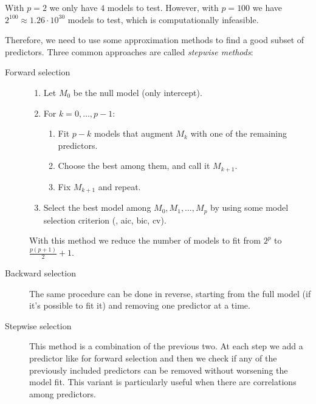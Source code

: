 \begin{example}
    With $p = 2$ we only have $4$ models to test. However, with $p = 100$ we have $2^{100} \approx 1.26 \cdot 10^{30}$ models to test, which is computationally infeasible.
\end{example}
Therefore, we need to use some approximation methods to find a good subset of predictors. Three common approaches are called \emph{stepwise methods}:
\begin{description}
    \item[Forward selection]\leavevmode
          \begin{enumerate}
              \item Let $M_0$ be the null model (only intercept).
              \item For $k = 0, \ldots, p-1$:
                    \begin{enumerate}
                        \item Fit $p - k$ models that augment $M_k$ with one of the remaining predictors.
                        \item Choose the best among them, and call it $M_{k+1}$.
                        \item Fix $M_{k+1}$ and repeat.
                    \end{enumerate}
              \item Select the best model among $M_0, M_1, \ldots, M_p$ by using some model selection criterion (\eg, \acs{aic}, \acs{bic}, \acs{cv}).
          \end{enumerate}
          With this method we reduce the number of models to fit from $2^p$ to $\frac{p(p+1)}{2} + 1$.
    \item[Backward selection] The same procedure can be done in reverse, starting from the full model (if it's possible to fit it) and removing one predictor at a time.
    \item[Stepwise selection] This method is a combination of the previous two. At each step we add a predictor like for forward selection and then we check if any of the previously included predictors can be removed without worsening the model fit. This variant is particularly useful when there are correlations among predictors.
\end{description}